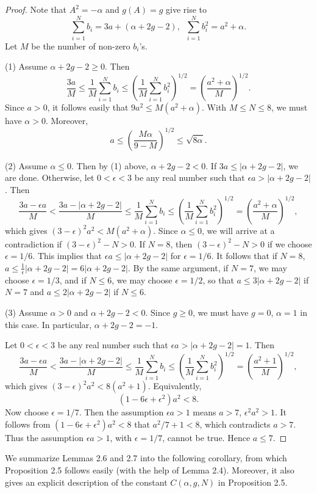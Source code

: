 \documentclass[11pt]{amsart}
\theoremstyle{plain}
\numberwithin{theorem}{section}
\theoremstyle{definition}
\begin{document}
\begin{proof}
Note that $A^2=-\alpha$ and $g(A)=g$ give rise to
$$
\sum_{i=1}^N b_i=3a+(\alpha+2g-2), \;\; \sum_{i=1}^N b_i^2=a^2+\alpha.
$$
Let $M$ be the number of non-zero $b_i$'s. 

(1) Assume $\alpha+2g-2\geq 0$. Then 
$$
\frac{3a}{M}\leq \frac{1}{M} \sum_{i=1}^N b_i\leq (\frac{1}{M} \sum_{i=1}^N b_i^2)^{1/2}=(\frac{a^2+\alpha}{M})^{1/2}.
$$
Since $a>0$, it follows easily that $9a^2\leq M(a^2+\alpha)$. With $M\leq N\leq 8$, we must have $\alpha>0$. Moreover,
$$
a\leq (\frac{M\alpha}{9-M})^{1/2}\leq \sqrt{8\alpha}. 
$$

(2) Assume $\alpha\leq 0$. Then by (1) above, $\alpha+2g-2<0$. If $3a\leq |\alpha+2g-2|$, we are done. Otherwise,
let $0<\epsilon<3$ be any real number such that $\epsilon a>|\alpha+2g-2|$. Then 
$$
\frac{3a-\epsilon a}{M}<\frac{3a-|\alpha+2g-2|}{M}
\leq \frac{1}{M} \sum_{i=1}^N b_i\leq (\frac{1}{M} \sum_{i=1}^N b_i^2)^{1/2}=(\frac{a^2+\alpha}{M})^{1/2},
$$
which gives $(3-\epsilon)^2a^2< M(a^2+\alpha)$. Since $\alpha\leq 0$, we will 
arrive at a contradiction if $(3-\epsilon)^2-N>0$. If $N=8$, then $(3-\epsilon)^2-N>0$ if we choose 
$\epsilon=1/6$. This implies that $\epsilon a\leq |\alpha+2g-2|$ for $\epsilon=1/6$. It follows that if $N=8$, $a\leq \frac{1}{\epsilon}|\alpha+2g-2|=6|\alpha+2g-2|$. By the same argument, if $N=7$, we may choose $\epsilon=1/3$, and if $N\leq 6$, we may choose $\epsilon=1/2$, so that 
$a\leq 3|\alpha+2g-2|$ if $N=7$ and $a\leq 2|\alpha+2g-2|$ if $N\leq 6$.

(3) Assume $\alpha>0$ and $\alpha+2g-2<0$. Since $g\geq 0$, we must have $g=0$, $\alpha=1$ in this case. In particular, $\alpha+2g-2=-1$. 

Let $0<\epsilon<3$ be any real number such that $\epsilon a> |\alpha+2g-2|=1$. Then
$$
\frac{3a-\epsilon a}{M}<\frac{3a-|\alpha+2g-2|}{M}
\leq \frac{1}{M} \sum_{i=1}^N b_i\leq (\frac{1}{M} \sum_{i=1}^N b_i^2)^{1/2}=(\frac{a^2+1}{M})^{1/2},
$$
which gives $(3-\epsilon)^2a^2< 8(a^2+1)$. Equivalently, 
$$
(1-6\epsilon +\epsilon^2)a^2<8. 
$$
Now choose $\epsilon=1/7$. Then the assumption $\epsilon a>1$ means $a>7$, $\epsilon^2a^2>1$.
It follows from $(1-6\epsilon +\epsilon^2)a^2<8$ that $a^2/7+1<8$, which contradicts $a>7$. Thus the 
assumption $\epsilon a>1$, with $\epsilon=1/7$, cannot be true. Hence $a\leq 7$. 

\end{proof}

We summarize Lemmas 2.6 and 2.7 into the following corollary, from which Proposition 2.5 follows easily
(with the help of Lemma 2.4). Moreover, it also gives an explicit description of the constant $C(\alpha,g,N)$ in Proposition 2.5.
\end{document}
